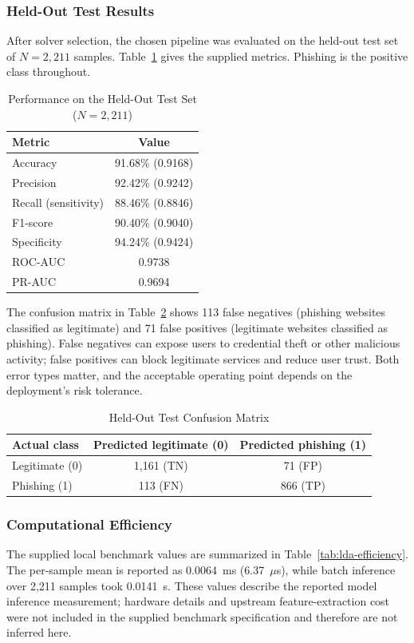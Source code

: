 \documentclass[conference]{IEEEtran}
\begin{document}
\subsubsection{Held-Out Test Results}
After solver selection, the chosen pipeline was evaluated on the held-out test set of $N=2{,}211$ samples. Table~\ref{tab:lda-performance} gives the supplied metrics. Phishing is the positive class throughout.

\begin{table}[!t]
\caption{Performance on the Held-Out Test Set ($N=2{,}211$)}
\label{tab:lda-performance}
\centering
\footnotesize
\begin{tabular}{lc}
\toprule
\textbf{Metric} & \textbf{Value}\\
\midrule
Accuracy & 91.68\% (0.9168)\\
Precision & 92.42\% (0.9242)\\
Recall (sensitivity) & 88.46\% (0.8846)\\
F1-score & 90.40\% (0.9040)\\
Specificity & 94.24\% (0.9424)\\
ROC-AUC & 0.9738\\
PR-AUC & 0.9694\\
\bottomrule
\end{tabular}
\end{table}

The confusion matrix in Table~\ref{tab:lda-confusion} shows 113 false negatives (phishing websites classified as legitimate) and 71 false positives (legitimate websites classified as phishing). False negatives can expose users to credential theft or other malicious activity; false positives can block legitimate services and reduce user trust. Both error types matter, and the acceptable operating point depends on the deployment's risk tolerance.

\begin{table}[!t]
\caption{Held-Out Test Confusion Matrix}
\label{tab:lda-confusion}
\centering
\footnotesize
\begin{tabular}{lcc}
\toprule
\textbf{Actual class} & \textbf{Predicted legitimate (0)} & \textbf{Predicted phishing (1)}\\
\midrule
Legitimate (0) & 1,161 (TN) & 71 (FP)\\
Phishing (1) & 113 (FN) & 866 (TP)\\
\bottomrule
\end{tabular}
\end{table}

\subsubsection{Computational Efficiency}
The supplied local benchmark values are summarized in Table~\ref{tab:lda-efficiency}. The per-sample mean is reported as 0.0064~ms (6.37~$\mu$s), while batch inference over 2,211 samples took 0.0141~s. These values describe the reported model inference measurement; hardware details and upstream feature-extraction cost were not included in the supplied benchmark specification and therefore are not inferred here.
\end{document}
